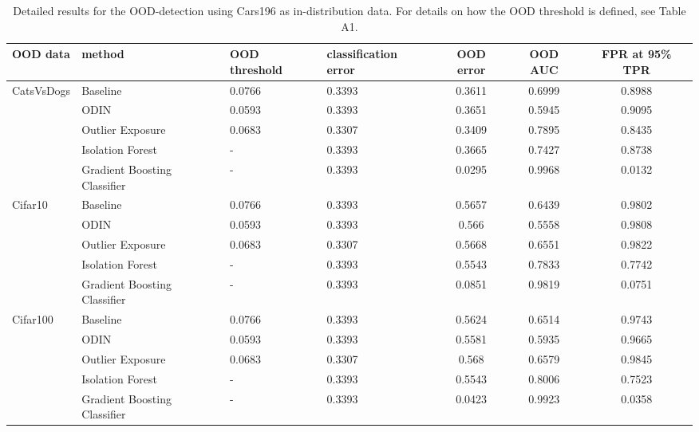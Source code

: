 \documentclass{article}
\begin{document}
 \begin{table}[h]
    \centering
    \caption{Detailed results for the OOD-detection using Cars196 as in-distribution data. For details on how the OOD threshold is defined, see Table A1.}
\begin{tabular}{lllHccc}
\toprule
            OOD data & method                              & OOD threshold & classification error & OOD error & OOD AUC & FPR at 95\% TPR \\
\toprule
CatsVsDogs & Baseline &        0.0766 &               0.3393 &    0.3611 &  0.6999 &         0.8988 \\
            & ODIN &        0.0593 &               0.3393 &    0.3651 &  0.5945 &         0.9095 \\
            & Outlier Exposure &        0.0683 &               0.3307 &    0.3409 &  0.7895 &         0.8435 \\
            & Isolation Forest &             - &               0.3393 &    0.3665 &  0.7427 &         0.8738 \\
            & Gradient Boosting Classifier &             - &               0.3393 &    0.0295 &  0.9968 &         0.0132 \\
\midrule
Cifar10 & Baseline &        0.0766 &               0.3393 &    0.5657 &  0.6439 &         0.9802 \\
            & ODIN &        0.0593 &               0.3393 &     0.566 &  0.5558 &         0.9808 \\
            & Outlier Exposure &        0.0683 &               0.3307 &    0.5668 &  0.6551 &         0.9822 \\
            & Isolation Forest &             - &               0.3393 &    0.5543 &  0.7833 &         0.7742 \\
            & Gradient Boosting Classifier &             - &               0.3393 &    0.0851 &  0.9819 &         0.0751 \\
\midrule
Cifar100 & Baseline &        0.0766 &               0.3393 &    0.5624 &  0.6514 &         0.9743 \\
            & ODIN &        0.0593 &               0.3393 &    0.5581 &  0.5935 &         0.9665 \\
            & Outlier Exposure &        0.0683 &               0.3307 &     0.568 &  0.6579 &         0.9845 \\
            & Isolation Forest &             - &               0.3393 &    0.5543 &  0.8006 &         0.7523 \\
            & Gradient Boosting Classifier &             - &               0.3393 &    0.0423 &  0.9923 &         0.0358 \\

\end{tabular}
\end{table}
\end{document}
